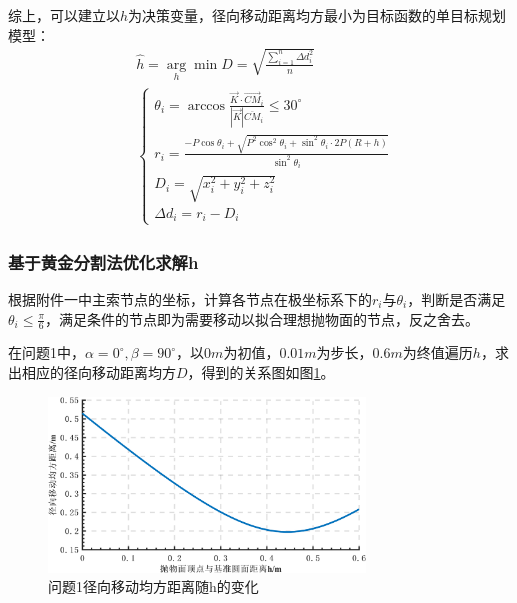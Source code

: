 \documentclass[withoutpreface,bwprint]{cumcmthesis} %
\begin{document}
		
		综上，可以建立以$h$为决策变量，径向移动距离均方最小为目标函数的单目标规划模型：
		\begin{equation}
		\begin{aligned}
		&\hat{h}=\underset{h}{\arg } \min D=\sqrt{\frac{\sum_{i=1}^{n} \Delta d_{i}^{2}}{n}}\\
		&\left\{\begin{array}{l}
		\theta_{i}=\arccos \frac{\vec{K} \cdot \overrightarrow{C M}_{i}}{|\vec{K}| \overline{C M}_{i}} \leqslant 30^{\circ} \\
		r_{i}=\frac{-P \cos \theta_{i}+\sqrt{P^{2} \cos ^{2} \theta_{i}+\sin ^{2} \theta_{i} \cdot 2 P(R+h)}}{\sin ^{2} \theta_{i}} \\
		D_{i}=\sqrt{x_{i}^{2}+y_{i}^{2}+z_{i}^{2}} \\
		\Delta d_{i}=r_{i}-D_{i}
		\end{array}\right.
		\end{aligned}
		\end{equation}
		
		
		
		
		\subsubsection{基于黄金分割法优化求解h}
		根据附件一中主索节点的坐标，计算各节点在极坐标系下的$r_i$与$\theta_i$，判断是否满足$\theta_i\le\frac{\pi}{6}$，满足条件的节点即为需要移动以拟合理想抛物面的节点，反之舍去。
		
		
		在问题1中，$\alpha=0^\circ,\beta=90^\circ$，以$0m$为初值，$0.01m$为步长，$0.6m$为终值遍历$h$，求出相应的径向移动距离均方$D$，得到的关系图如图\ref{问题1径向移动均方距离随h的变化}。
			\begin{figure}[!htp]
			\centering
			\includegraphics[width=0.75\textwidth]{问题1径向移动均方距离随h的变化}
			\caption{问题1径向移动均方距离随h的变化}
			\label{问题1径向移动均方距离随h的变化}
		\end{figure}
		
\end{document}
